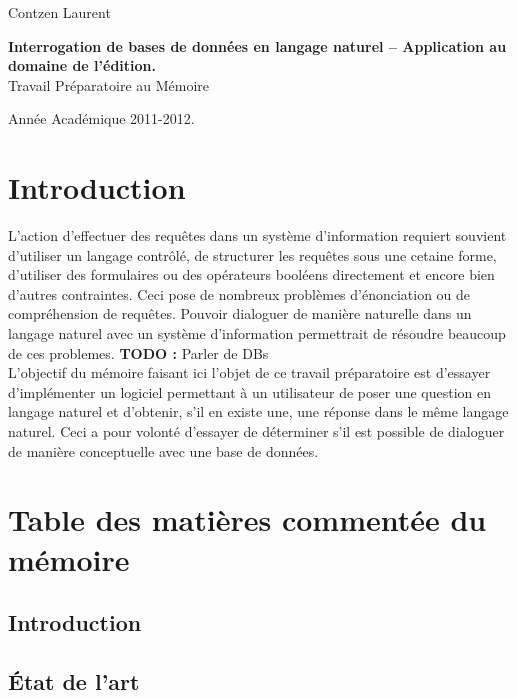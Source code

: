 \documentclass[11pt]{article}
\author{Contzen Laurent}
\begin{document}
\begin{titlepage}  
  \begin{flushleft}
    Contzen Laurent
  \end{flushleft}
  \begin{center}
    \vspace{82mm}\LARGE{\textbf{Interrogation de bases de données en langage naturel – Application au domaine de l’édition.} \\    
      Travail Préparatoire au Mémoire}
  \end{center}
  \begin{flushright}
    \vspace{92mm}
    Année Académique 2011-2012.             
  \end{flushright}
\end{titlepage}

\tableofcontents
\newpage

\section{Introduction}
L'action d'effectuer des requêtes dans un système d'information requiert souvient d'utiliser un langage contrôlé, de structurer les requêtes sous une cetaine forme, d'utiliser des formulaires ou des opérateurs booléens directement et encore bien d'autres contraintes. Ceci pose de nombreux problèmes d'énonciation ou de compréhension de requêtes. Pouvoir dialoguer de manière naturelle dans un langage naturel avec un système d'information permettrait de résoudre beaucoup de ces problemes. \colorbox{BrickRed}{\textbf{TODO : } Parler de DBs} \\
L'objectif du mémoire faisant ici l'objet de ce travail préparatoire est d'essayer d'implémenter un logiciel permettant à un utilisateur de poser une question en langage naturel et d'obtenir, s'il en existe une, une réponse dans le même langage naturel. Ceci a pour volonté d'essayer de déterminer s'il est possible de dialoguer de manière conceptuelle avec une base de données.

\section{Table des matières commentée du mémoire}
\subsection{Introduction}
\subsection{État de l'art}
\end{document}
